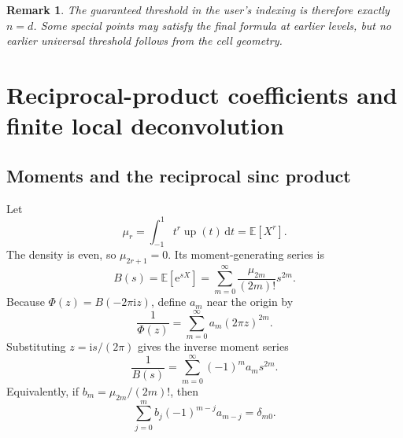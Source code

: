 \documentclass[11pt]{article}
\newtheorem{remark}[theorem]{Remark}
\newcommand{\dd}{\,\mathrm{d}}
\newcommand{\upf}{\operatorname{up}}
\newcommand{\e}{\mathrm{e}}
\newcommand{\ii}{\mathrm{i}}
\begin{document}
\begin{remark}
The guaranteed threshold in the user's indexing is therefore exactly
\(n=d\).  Some special points may satisfy the final formula at earlier levels,
but no earlier universal threshold follows from the cell geometry.
\end{remark}

\section{Reciprocal-product coefficients and finite local deconvolution}

\subsection{Moments and the reciprocal sinc product}

Let
\begin{equation}\label{eq:moments}
 \mu_r=\int_{-1}^{1}t^r\upf(t)\dd t=\mathbb{E}[X^r].
\end{equation}
The density is even, so \(\mu_{2r+1}=0\).  Its moment-generating series is
\begin{equation}\label{eq:moment-series}
 B(s)=\mathbb{E}[\e^{sX}]
     =\sum_{m=0}^{\infty}\frac{\mu_{2m}}{(2m)!}s^{2m}.
\end{equation}
Because \(\Phi(z)=B(-2\pi\ii z)\), define \(a_m\) near the origin by
\begin{equation}\label{eq:reciprocal-def}
 \frac{1}{\Phi(z)}
 =\sum_{m=0}^{\infty}a_m(2\pi z)^{2m}.
\end{equation}
Substituting \(z=\ii s/(2\pi)\) gives the inverse moment series
\begin{equation}\label{eq:inverse-moment-series}
 \frac{1}{B(s)}=\sum_{m=0}^{\infty}(-1)^m a_m s^{2m}.
\end{equation}
Equivalently, if \(b_m=\mu_{2m}/(2m)!\), then
\begin{equation}\label{eq:convolution-inverse-coeff}
 \sum_{j=0}^{m}b_j(-1)^{m-j}a_{m-j}=\delta_{m0}.
\end{equation}
\end{document}
